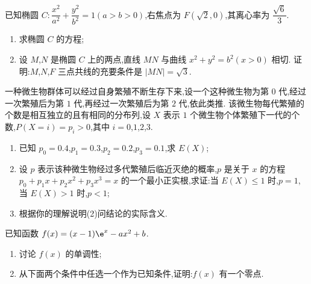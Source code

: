 \begin{problem}
已知椭圆 \(C:\dfrac{x^2}{a^2}+\dfrac{y^2}{b^2}=1\left(a>b>0\right)\),右焦点为 \(F\left(\sqrt2,0\right)\),其离心率为 \(\dfrac{\sqrt6}{3}\).

\begin{enumerate}
\item 求椭圆 \(C\) 的方程;
\item 设 \(M\),\(N\) 是椭圆 \(C\) 上的两点,直线 \(MN\) 与曲线 \(x^2+y^2=b^2\left(x>0\right)\) 相切. 证明:\(M\),\(N\),\(F\) 三点共线的充要条件是 \(|MN|=\sqrt3\).
\end{enumerate}
\end{problem}

\begin{problem}
一种微生物群体可以经过自身繁殖不断生存下来,设一个这种微生物为第 \(0\) 代,经过一次繁殖后为第 \(1\) 代,再经过一次繁殖后为第 \(2\) 代,依此类推. 该微生物每代繁殖的个数是相互独立的且有相同的分布列,设 \(X\) 表示 \(1\) 个微生物个体繁殖下一代的个数,\(P(X=i)=p_i>0\),其中 \(i=0\),\(1\),\(2\),\(3\).

\begin{enumerate}
\item 已知 \(p_0=0.4\),\(p_1=0.3\),\(p_2=0.2\),\(p_3=0.1\),求 \(E(X)\);
\item 设 \(p\) 表示该种微生物经过多代繁殖后临近灭绝的概率,\(p\) 是关于 \(x\) 的方程 \(p_0+p_1x+p_2x^2+p_3x^3=x\) 的一个最小正实根,求证:当 \(E(X)\le1\) 时,\(p=1\),当 \(E(X)>1\) 时,\(p<1\);
\item 根据你的理解说明(2)问结论的实际含义.
\end{enumerate}
\end{problem}

\begin{problem}
已知函数 \(f(x)=(x-1)\e^x-ax^2+b\).

\begin{enumerate}
\item 讨论 \(f(x)\) 的单调性;
\item 从下面两个条件中任选一个作为已知条件,证明:\(f(x)\) 有一个零点.
\end{enumerate}
\end{problem}

